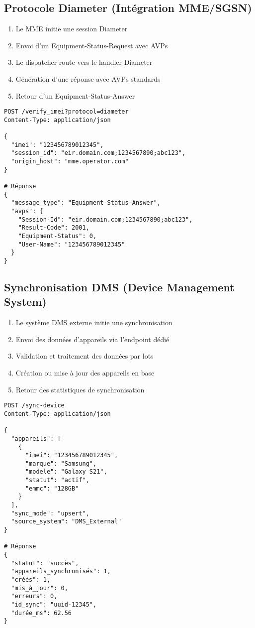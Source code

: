 \documentclass[11pt]{article}
\begin{document}
\subsection{Protocole Diameter (Intégration MME/SGSN)}

\begin{enumerate}
    \item Le MME initie une session Diameter
    \item Envoi d'un Equipment-Status-Request avec AVPs
    \item Le dispatcher route vers le handler Diameter
    \item Génération d'une réponse avec AVPs standards
    \item Retour d'un Equipment-Status-Answer
\end{enumerate}

\begin{lstlisting}[caption=Exemple Diameter]
POST /verify_imei?protocol=diameter
Content-Type: application/json

{
  "imei": "123456789012345",
  "session_id": "eir.domain.com;1234567890;abc123",
  "origin_host": "mme.operator.com"
}

# Réponse
{
  "message_type": "Equipment-Status-Answer",
  "avps": {
    "Session-Id": "eir.domain.com;1234567890;abc123",
    "Result-Code": 2001,
    "Equipment-Status": 0,
    "User-Name": "123456789012345"
  }
}
\end{lstlisting}

\subsection{Synchronisation DMS (Device Management System)}

\begin{enumerate}
    \item Le système DMS externe initie une synchronisation
    \item Envoi des données d'appareils via l'endpoint dédié
    \item Validation et traitement des données par lots
    \item Création ou mise à jour des appareils en base
    \item Retour des statistiques de synchronisation
\end{enumerate}

\begin{lstlisting}[caption=Exemple Synchronisation DMS]
POST /sync-device
Content-Type: application/json

{
  "appareils": [
    {
      "imei": "123456789012345",
      "marque": "Samsung",
      "modele": "Galaxy S21",
      "statut": "actif",
      "emmc": "128GB"
    }
  ],
  "sync_mode": "upsert",
  "source_system": "DMS_External"
}

# Réponse
{
  "statut": "succès",
  "appareils_synchronisés": 1,
  "créés": 1,
  "mis_à_jour": 0,
  "erreurs": 0,
  "id_sync": "uuid-12345",
  "durée_ms": 62.56
}
\end{lstlisting}
\end{document}
